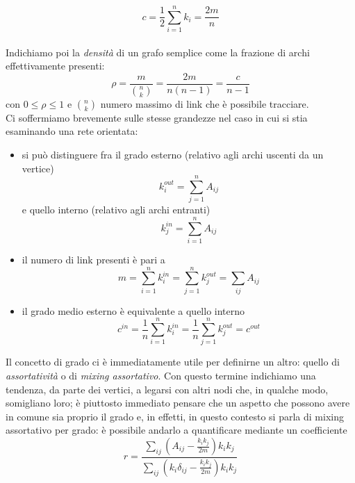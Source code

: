 \begin{equation}
 	c = \frac{1}{2} \sum_{i=1}^n k_i = \frac{2m}{n} 
\end{equation}
 \\Indichiamo poi la \emph{densità} di un grafo semplice come la frazione di archi effettivamente presenti:
\begin{equation}
	\rho = \frac{m}{\binom{n}{k}} = \frac{2m}{n\left(n-1 \right)} = \frac{c}{n-1}
\end{equation}
con $ 0 \leq \rho \leq  1 $ e  $ \binom{n}{k} $  numero massimo di link che è possibile tracciare. \\Ci soffermiamo brevemente sulle stesse grandezze nel caso in cui si stia esaminando una rete orientata:
\begin{itemize}
\item si può distinguere fra il grado esterno (relativo agli archi uscenti da un vertice)
	\begin{equation}
		k_{i}^{out} = \sum_{j=1}^n A_{ij}	
	\end{equation}
e quello interno (relativo agli archi entranti)
	\begin{equation}
		k_{j}^{in} = \sum_{i=1}^n A_{ij}
	\end{equation}
\item il numero di link presenti è pari a
	\begin{equation}
		m = \sum_{i=1}^n k_i^{in} = \sum_{j=1}^n k_j^{out} = \sum_{ij} A_{ij}
	\end{equation}
\item il grado medio esterno è equivalente a quello interno
	\begin{equation}
		c^{in} = \frac{1}{n} \sum_{i=1}^n k_i^{in} = \frac{1}{n} \sum_{j=1}^n k_j^{out} = c^{out}
	\end{equation}
\end{itemize}


Il concetto di grado ci è immediatamente utile per definirne un altro: quello di \emph{assortatività} o di \emph{mixing assortativo}.
 Con questo termine indichiamo una tendenza, da parte dei vertici, a legarsi con altri nodi che, in qualche modo, somigliano loro; è piuttosto immediato pensare che un aspetto che possono avere in comune sia proprio il grado e, in effetti, in questo contesto si parla di mixing assortativo per grado: è possibile andarlo a quantificare mediante un coefficiente \cite{Newman}
\begin{equation}
	r = \frac{ \sum_{ij} \left( A_{ij} - \frac{k_i k_j}{2m} \right) k_i k_j}{\sum_{ij} \left(k_i \delta_{ij} - \frac{k_i k_j}{2m} \right) k_i k_j}
\end{equation}